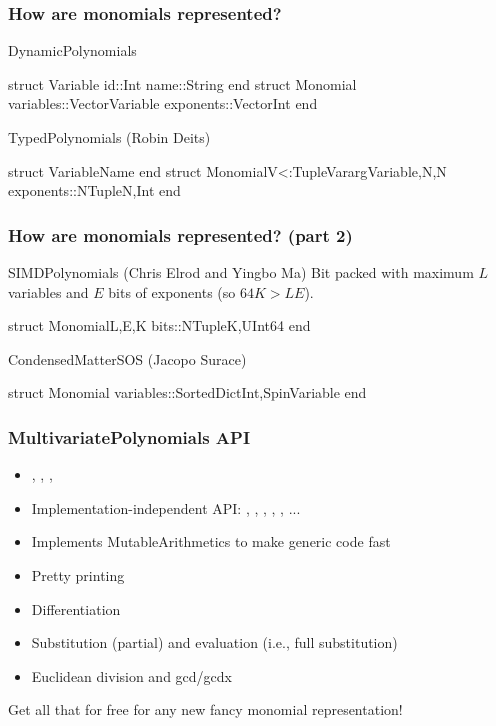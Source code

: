 \documentclass{beamer}
\begin{document}
  \begin{frame}[fragile]
    \frametitle{How are monomials represented?}
    \begin{block}{DynamicPolynomials}
      \vspace{-0.5cm}
\begin{jllisting}
struct Variable
    id::Int
    name::String
end
struct Monomial
    variables::Vector{Variable}
    exponents::Vector{Int}
end
\end{jllisting}
      \vspace{-0.5cm}
    \end{block}

    \begin{block}{TypedPolynomials (Robin Deits)}
      \vspace{-0.5cm}
\begin{jllisting}
struct Variable{Name} end
struct Monomial{V<:Tuple{Vararg{Variable,N}},N}
    exponents::NTuple{N,Int}
end
\end{jllisting}
    \end{block}
      \vspace{-1cm}
  \end{frame}

  \begin{frame}[fragile]
    \frametitle{How are monomials represented? (part 2)}
    \begin{block}{SIMDPolynomials (Chris Elrod and Yingbo Ma)}
      Bit packed with maximum $L$ variables and $E$ bits of exponents (so $64K > LE$).
\begin{jllisting}
struct Monomial{L,E,K}
    bits::NTuple{K,UInt64}
end
\end{jllisting}
    \end{block}
    \begin{block}{CondensedMatterSOS (Jacopo Surace)}
\begin{jllisting}
struct Monomial
    variables::SortedDict{Int,SpinVariable}
end
\end{jllisting}
    \end{block}

  \end{frame}

  \begin{frame}[fragile]
    \frametitle{MultivariatePolynomials API}
    \begin{itemize}
      \item {}, , , 
      \item Implementation-independent API: , , , , \jlinl{+}, ...
      \item Implements MutableArithmetics to make \alert{generic} code \alert{fast}
      \item Pretty printing
      \item Differentiation
      \item Substitution (partial) and evaluation (i.e., full substitution)
      \item Euclidean division and \alert{gcd}/\alert{gcdx}
    \end{itemize}
    Get all that for free for any new fancy monomial representation!
  \end{frame}
\end{document}
